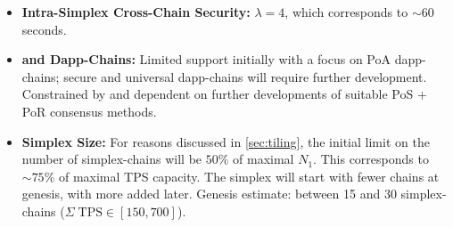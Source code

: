 \begin{itemize}
    \item \textbf{Intra-Simplex Cross-Chain Security:} $\lambda = 4$, which corresponds to $\sim 60$ seconds.
    \item \textbf{ and Dapp-Chains:} Limited support initially with a focus on PoA dapp-chains; secure and universal dapp-chains will require further development.
    Constrained by and dependent on further developments of suitable PoS + PoR consensus methods.
    \item \textbf{Simplex Size:} For reasons discussed in \autoref{sec:tiling}, the initial limit on the number of simplex-chains will be $50\%$ of maximal $N_1$.
    This corresponds to $\sim 75\%$ of maximal TPS capacity.
    The simplex will start with fewer chains at genesis, with more added later.
    Genesis estimate: between 15 and 30 simplex-chains ($\Sigma\;\text{TPS} \in [150, 700]$).
\end{itemize}
